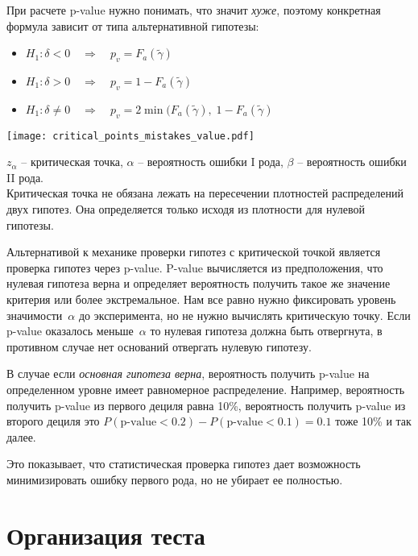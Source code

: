 \documentclass[../handbook.tex]{subfiles}
\begin{document}
При расчете p-value нужно понимать, что значит \emph{хуже}, поэтому конкретная формула зависит от типа альтернативной гипотезы:
\begin{itemize}
    \item $H_1: \delta < 0 \quad \Rightarrow \quad p_v = F_a(\tilde\gamma)$ 
    \item $H_1: \delta > 0 \quad \Rightarrow \quad p_v = 1 - F_a(\tilde\gamma)$ 
    \item $H_1: \delta \ne 0 \quad \Rightarrow \quad p_v = 2\min(F_a(\tilde\gamma),\; 1 - F_a(\tilde\gamma)$ 
\end{itemize}

\begin{marginfigure}
    \texttt{[image: critical\_points\_mistakes\_value.pdf]}
    \caption{$z_\alpha$ -- критическая точка, $\alpha$ -- вероятность ошибки I рода, $\beta$ -- вероятность ошибки II рода. \\
    Критическая точка не обязана лежать на пересечении плотностей распределений
    двух гипотез. Она определяется только исходя из плотности для нулевой
    гипотезы.
    }
    \label{fig:crit_point}
\end{marginfigure}

Альтернативой к механике проверки гипотез с критической точкой является
проверка гипотез через p-value. P-value вычисляется из предположения, что
нулевая гипотеза верна и определяет вероятность получить такое же значение
критерия или более экстремальное. Нам все равно нужно фиксировать уровень
значимости~$\alpha$ до эксперимента, но не нужно вычислять критическую точку.
Если p-value оказалось меньше~$\alpha$ то нулевая гипотеза должна быть
отвергнута, в противном случае нет оснований отвергать нулевую гипотезу.

В случае если \emph{основная гипотеза верна}, вероятность получить p-value на
определенном уровне имеет равномерное распределение. Например, вероятность
получить p-value из первого дециля равна 10\%, вероятность получить p-value из
второго дециля это $P(\text{p-value} < 0.2) - P(\text{p-value} < 0.1) = 0.1$
тоже 10\% и так далее.

Это показывает, что статистическая проверка гипотез дает
возможность минимизировать ошибку первого рода, но не убирает ее полностью. 

\section{Организация теста}
\end{document}
